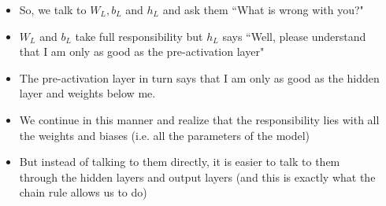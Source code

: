 \begin{frame}
  \begin{columns}
    \begin{overlayarea}{\textwidth}{\textheight}
      \footnotesize{
        \begin{itemize}
          \justifying
          \item So, we talk to $W_{L},b_{L}$ and $h_{L}$ and ask them ``What is wrong with you?"
          \item<2-> $W_{L}$ and $b_{L}$ take full responsibility but $h_{L}$ says ``Well, please understand that I am only as good as the pre-activation layer"
          \item<3-> The pre-activation layer in turn says that I am only as good as the hidden layer and weights below me.
          \item<4-> We continue in this manner and realize that the responsibility lies with all the weights and biases (i.e. all the parameters of the model)
          \item<5-> But instead of talking to them directly, it is easier to talk to them through the hidden layers and output layers (and this is exactly what the chain rule allows us to do)
        \end{itemize}
      }
    \end{overlayarea}

    \begin{overlayarea}{\textwidth}{\textheight}
      
    \end{overlayarea}
  \end{columns}
\end{frame}

